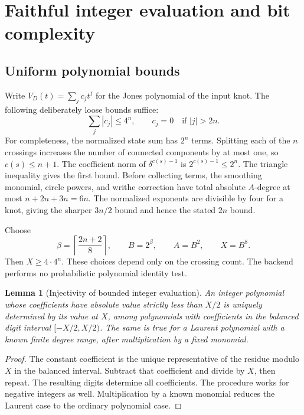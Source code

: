 \documentclass[11pt]{article}
\newtheorem{lemma}[theorem]{Lemma}
\theoremstyle{definition}
\theoremstyle{remark}
\begin{document}
\section{Faithful integer evaluation and bit complexity}
\label{sec:encoding}

\subsection{Uniform polynomial bounds}

Write $V_D(t)=\sum_j c_jt^j$ for the Jones polynomial of the input knot.
The following deliberately loose bounds suffice:
\begin{equation}\label{eq:coefficient-bounds}
 \sum_j|c_j|\le4^n,
 \qquad c_j=0\quad\text{if }|j|>2n.
\end{equation}
For completeness, the normalized state sum has $2^n$ terms. Splitting each
of the $n$ crossings increases the number of connected components by at
most one, so $c(s)\le n+1$. The coefficient norm of
$\delta^{c(s)-1}$ is $2^{c(s)-1}\le2^n$. The triangle inequality gives
the first bound. Before collecting terms, the smoothing monomial,
circle powers, and writhe correction have total absolute $A$-degree at
most $n+2n+3n=6n$. The normalized exponents are divisible by four for a
knot, giving the sharper $3n/2$ bound and hence the stated $2n$ bound.

Choose
\begin{equation}\label{eq:integer-base}
 \beta=\left\lceil\frac{2n+2}{8}\right\rceil,
 \qquad B=2^\beta,
 \qquad A=B^2,
 \qquad X=B^8.
\end{equation}
Then $X\ge4\cdot4^n$. These choices depend only on the crossing count.
The backend performs no probabilistic polynomial identity test.

\begin{lemma}[Injectivity of bounded integer evaluation]
\label{lem:balanced-injective}
An integer polynomial whose coefficients have absolute value strictly
less than $X/2$ is uniquely determined by its value at $X$, among
polynomials with coefficients in the balanced digit interval
$[-X/2,X/2)$. The same is true for a Laurent polynomial with a known
finite degree range, after multiplication by a fixed monomial.
\end{lemma}

\begin{proof}
The constant coefficient is the unique representative of the residue
modulo $X$ in the balanced interval. Subtract that coefficient and divide
by $X$, then repeat. The resulting digits determine all coefficients.
The procedure works for negative integers as well. Multiplication by a
known monomial reduces the Laurent case to the ordinary polynomial case.
\end{proof}
\end{document}

